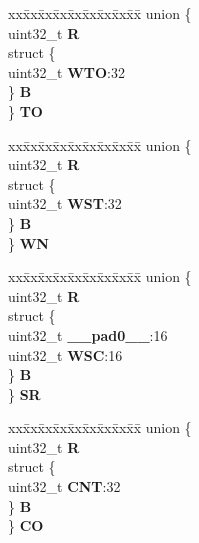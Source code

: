 \begin{DoxyCompactItemize}
\begin{tabbing}
\end{tabbing}\item 
\mbox{\label{structSWT__tag_adf257dbdfa343f6529b599367adf40ae}} 
\begin{tabbing}
xx\=xx\=xx\=xx\=xx\=xx\=xx\=xx\=xx\=\kill
union \{\\
\>uint32\_t {\bfseries R}\\
\>struct \{\\
\>\>uint32\_t {\bfseries WTO}:32\\
\>\} {\bfseries B}\\
\} {\bfseries TO}\\

\end{tabbing}\item 
\mbox{\label{structSWT__tag_aa0898e3e6bd6b385d64096531921523c}} 
\begin{tabbing}
xx\=xx\=xx\=xx\=xx\=xx\=xx\=xx\=xx\=\kill
union \{\\
\>uint32\_t {\bfseries R}\\
\>struct \{\\
\>\>uint32\_t {\bfseries WST}:32\\
\>\} {\bfseries B}\\
\} {\bfseries WN}\\

\end{tabbing}\item 
\mbox{\label{structSWT__tag_ab989288e7eaa49307483465702b10966}} 
\begin{tabbing}
xx\=xx\=xx\=xx\=xx\=xx\=xx\=xx\=xx\=\kill
union \{\\
\>uint32\_t {\bfseries R}\\
\>struct \{\\
\>\>uint32\_t {\bfseries \_\_pad0\_\_}:16\\
\>\>uint32\_t {\bfseries WSC}:16\\
\>\} {\bfseries B}\\
\} {\bfseries SR}\\

\end{tabbing}\item 
\mbox{\label{structSWT__tag_ae87cf3a19552607f68ab40a7b22df064}} 
\begin{tabbing}
xx\=xx\=xx\=xx\=xx\=xx\=xx\=xx\=xx\=\kill
union \{\\
\>uint32\_t {\bfseries R}\\
\>struct \{\\
\>\>uint32\_t {\bfseries CNT}:32\\
\>\} {\bfseries B}\\
\} {\bfseries CO}\\


\end{tabbing}
\end{DoxyCompactItemize}
